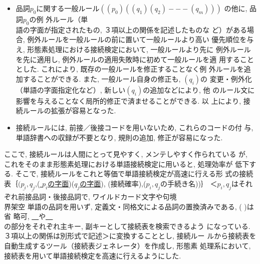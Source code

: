 \begin{itemize}
\item  品詞\hspace*{-0.1mm}\(p_{0}\)\hspace*{-0.1mm}に関する一般ルール\hspace*{-0.1mm}\(((p_{0})((q_{1})(q_{2})---(q_{m})))\)\hspace*{-0.1mm}
 の他に, 品詞\hspace*{-0.1mm}\(p_{0}\)\hspace*{-0.1mm}の例
外ルール（単\\語の字面が指定されたもの, ３項以上の関係を記述したものな
ど）がある場合, 例外ルールを一般ルールの前に置いて一般ルールより高い
優先順位を与え, 形態素処理における接続検定において, 一般ルールより先に
例外ルールを先に適用し, 例外ルールの適用失敗時に初めて一般ルールを適
用することとした. これにより, 既存の一般ルールを修正することなく例
外ルールを追加することができる. また, 一般ルール自身の修正も, \((q_{i})\)の
変更・例外化（単語の字面指定化など）, 新しい\((q_{i})\)の追加などにより, 他
のルール文に影響を与えることなく局所的修正で済ませることができる. 以
上により, 接続ルールの拡張が容易となった.

\item 接続ルールには, 前接／後接コードを用いないため, これらのコードの付
与, 単語辞書への収録が不要となり, 規則の追加, 修正が容易になった.
\end{itemize}

 ここで, 接続ルールは人間にとって見やすく, メンテしやすく作られている
が, これをそのまま形態素処理における単語接続検定に用いると, 処理効率が
低下する. そこで, 接続ルールをこれと等価で単語接続検定が高速に行える形
式の接続表｛\((\underline{p_{i}},\underline{q_{j}}\),(\underline{\underline{
\(p_{i}\)の字面}})(\underline{\underline{\(q_{j}\)の字面}}),
(接続確率),(\(p_{i},q_{j}\)の手続き名))｝
\hspace*{-0.2mm}＜\(p_{i},q_{j}\)はそれぞれ前接品詞・後接品詞で, 
ワイルドカード文字や句境\\界架空
単語の品詞を用いず, \hspace*{-0.1mm}定義文・同格文による品詞の置換済みである, ( )は省
略可, \hspace*{-0.1mm}\underline{　}\hspace*{-0.1mm}や\hspace*{-0.1mm}\underline{\underline{　}}\hspace*{-0.1mm}\\の部分をそれぞれ主キー,
 副キーとして接続表を検索できるよう
になっている. ３項以上の関係は別形式で記述＞に変換することとし, 接続ルー
ルから接続表を自動生成するツール（接続表ジェネレータ）を作成し, 形態素
処理系において, 接続表を用いて単語接続検定を高速に行えるようにした.


